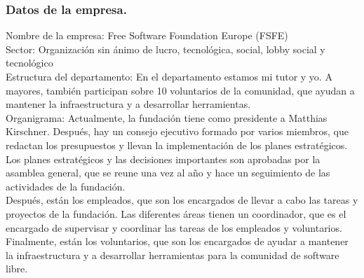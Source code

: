 \subsubsection{Datos de la empresa.}\label{subsubsec:datos-empresa}
    Nombre de la empresa: Free Software Foundation Europe (FSFE)\\
    Sector: Organización sin ánimo de lucro, tecnológica, social, lobby social y tecnológico\\
    Estructura del departamento\autocite{wwwFSFE-team}: En el departamento estamos mi tutor y yo.
    A mayores, también participan sobre 10 voluntarios de la comunidad, que ayudan a mantener la infraestructura y a desarrollar herramientas.\\
    Organigrama: Actualmente, la fundación tiene como presidente a Matthias Kirschner.
    Después, hay un consejo ejecutivo formado por varios miembros, que redactan los presupuestos y llevan la implementación de los planes estratégicos.
    Los planes estratégicos y las decisiones importantes son aprobadas por la asamblea general, que se reune una vez al año y hace un seguimiento de las actividades de la fundación.\\
    Después, están los empleados, que son los encargados de llevar a cabo las tareas y proyectos de la fundación.
    Las diferentes áreas tienen un coordinador, que es el encargado de supervisar y coordinar las tareas de los empleados y voluntarios.\\
    Finalmente, están los voluntarios, que son los encargados de ayudar a mantener la infraestructura y a desarrollar herramientas para la comunidad de software libre.\\


